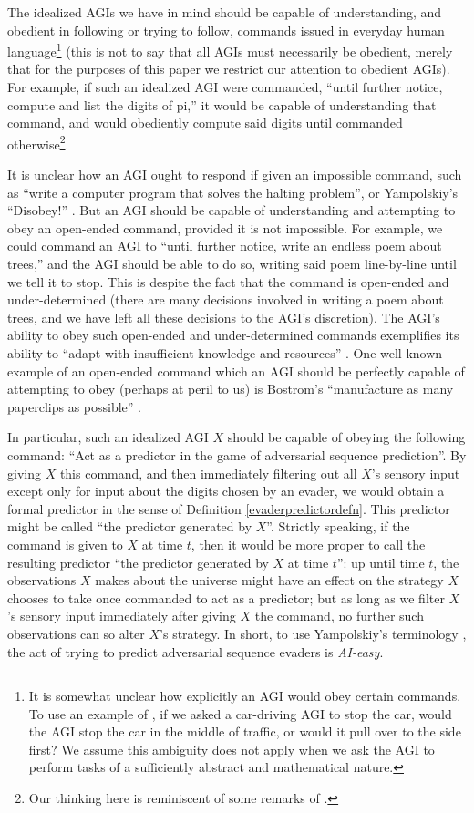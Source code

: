 \documentclass[twoside,11pt]{article}
\begin{document}
The idealized AGIs we have in mind should be capable of understanding,
and obedient in following or trying to follow, commands issued in everyday human
language\footnote{It is somewhat unclear how explicitly an AGI would
obey certain commands. To use an example of
\citet{yampolskiycontrol}, if we asked a car-driving AGI
to stop the car, would the AGI stop the car
in the middle of traffic, or would it pull over to the side first?
We assume this ambiguity does not apply when we ask the AGI to perform
tasks of a sufficiently abstract and mathematical nature.}
(this is not to say that all AGIs must necessarily be obedient, merely that
for the purposes of this paper we restrict our attention to obedient AGIs).
For example, if such an idealized
AGI were commanded, ``until further notice, compute and list the
digits of pi,'' it would be capable of understanding that command, and would
obediently compute said digits until commanded otherwise\footnote{Our thinking
here is reminiscent of some remarks of \citet{yampolskiy2013turing}.}.

It is unclear how an AGI ought to respond if given an impossible command,
such as ``write a computer program
that solves the halting problem'', or Yampolskiy's
``Disobey!'' \citep{yampolskiycontrol}. But an AGI should be capable of
understanding and attempting to obey an open-ended command, provided it is not
impossible. For example, we could command an AGI to ``until further notice,
write an endless poem about trees,'' and the AGI should be able to do so, writing
said poem line-by-line until we tell it to stop. This is despite the fact that the
command is open-ended and under-determined
(there are many decisions involved in writing a
poem about trees, and we have left all these decisions to the AGI's discretion).
The AGI's ability to obey such open-ended and under-determined commands
exemplifies its
ability to ``adapt with insufficient
knowledge and resources'' \citep{wang2019defining}.
One well-known example of an open-ended command which an AGI should be perfectly
capable of attempting to obey (perhaps at peril to us) is
Bostrom's ``manufacture as many paperclips as possible'' \citep{bostrom2003ethical}.

In particular, such an idealized AGI $X$ should be
capable of obeying the following command:
``Act as a predictor in the game of adversarial sequence prediction''.
By giving $X$ this command, and then immediately filtering out all $X$'s
sensory input except only for input about the digits chosen by an evader,
we would obtain a formal predictor in the sense of Definition \ref{evaderpredictordefn}.
This predictor might be called ``the predictor generated by $X$''. Strictly speaking,
if the command is given to $X$ at time $t$, then it would be more proper to call
the resulting predictor ``the predictor generated by $X$ at time $t$'': up until
time $t$, the observations $X$ makes about the universe might have an effect on
the strategy $X$ chooses to take once commanded to act as a predictor; but as long
as we filter $X$'s sensory input immediately after giving $X$ the command, no
further such observations can so alter $X$'s strategy.
In short, to use Yampolskiy's terminology \citep{yampolskiy2012ai}, the act of
trying to predict adversarial sequence evaders is \emph{AI-easy}.
\end{document}
